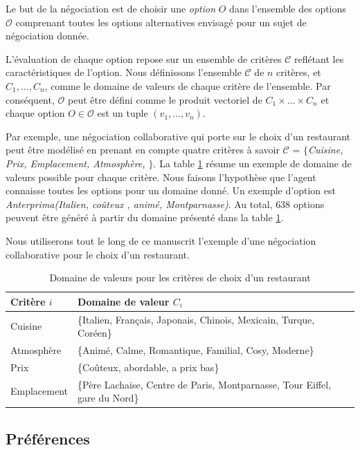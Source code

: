 		Le but de la négociation est de choisir une \textit{option} $O$ dans l'ensemble des options $\mathcal{O}$ comprenant toutes les options alternatives envisagé pour un sujet de négociation donnée. 
		
		L'évaluation de chaque option repose sur un ensemble de critères $\mathcal{C}$ reflétant les caractéristiques de l'option. Nous définissons l'ensemble $\mathcal{C}$ de $n$ critères, et $C_1,\ldots,C_n$, comme le domaine de valeurs de chaque critère de l'ensemble. 
		Par conséquent, $\mathcal{O}$ peut être défini comme le produit vectoriel de  $C_1\times\ldots\times C_n$ et chaque option $O \in \mathcal{O}$ est un tuple $(v_1,\ldots,v_n)$. 
		
		Par exemple, une négociation collaborative qui porte sur le choix d'un restaurant peut être modélisé en prenant en compte quatre critères à savoir $\mathcal{C}$ = \emph{$\{$Cuisine, Prix, Emplacement, Atmosphère, $\}$}. La table \ref{tab:domain} résume un exemple de domaine de valeurs possible pour chaque critère. Nous faisons l'hypothèse que l'agent connaisse toutes les options pour un domaine donné. Un exemple d'option est  \emph{Anterprima(Italien, coûteux , animé, Montparnasse)}. Au total, $638$ options peuvent être généré à partir du domaine présenté dans la table \ref{tab:domain}. 
		
		Nous utiliserons tout le long de ce manuscrit l'exemple d'une négociation collaborative pour le choix d'un restaurant. 
		\begin{table}[h]
			\centering
			\begin{tabular}{|p{2.25cm}|p{8.6cm}|}
				\hline
				Critère $i $ & Domaine de valeur $C_i$ \\
				\hline
				Cuisine & \{Italien, Français, Japonais, Chinois, Mexicain, Turque, Coréen\} \\
				\hline
				Atmosphère & \{Animé, Calme, Romantique, Familial, Cosy, Moderne\} \\
				\hline
				Prix & \{Coûteux, abordable, a prix bas\} \\
				\hline
				Emplacement & \{Père Lachaise, Centre de Paris, Montparnasse, Tour Eiffel, gare du Nord\} \\
				\hline
				
			\end{tabular}
			\caption{Domaine de valeurs pour les critères de choix d'un restaurant} 
			\label{tab:domain}
		\end{table}
		
		
		\subsection{Préférences}
		
